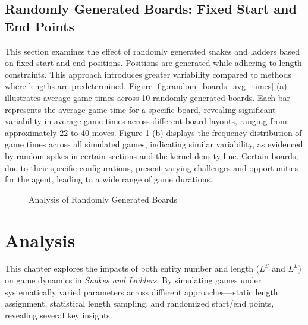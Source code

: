 \subsection{Randomly Generated Boards: Fixed Start and End Points}

This section examines the effect of randomly generated snakes and ladders based on fixed start and end positions. Positions are generated while adhering to length constraints. This approach introduces greater variability compared to methods where lengths are predetermined. Figure \ref{fig:random_boards_avg_times} (a) illustrates average game times across 10 randomly generated boards. Each bar represents the average game time for a specific board, revealing significant variability in average game times across different board layouts, ranging from approximately 22 to 40 moves. Figure \ref{fig:random_boards_game_dist} (b) displays the frequency distribution of game times across all simulated games, indicating similar variability, as evidenced by random spikes in certain sections and the kernel density line. Certain boards, due to their specific configurations, present varying challenges and opportunities for the agent, leading to a wide range of game durations.

\begin{figure}[ht]
	\centering
	\caption{Analysis of Randomly Generated Boards}
	\label{fig:random_boards_avg_times}
	\label{fig:random_boards_game_dist}
\end{figure}


\section{Analysis}

This chapter explores the impacts of both entity number and length ($L^S$ and $L^L$) on game dynamics in \textit{Snakes and Ladders}. By simulating games under systematically varied parameters across different approaches—static length assignment, statistical length sampling, and randomized start/end points, revealing several key insights.

